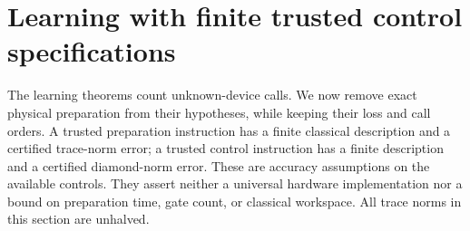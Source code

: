 \section{Learning with finite trusted control specifications}
\label{sec:finitecontrol78}

The learning theorems count unknown-device calls.  We now remove
exact physical preparation from their hypotheses, while keeping
their loss and call orders.  A trusted preparation instruction has a
finite classical description and a certified trace-norm error; a
trusted control instruction has a finite description and a certified
diamond-norm error.  These are accuracy assumptions on the available
controls.  They assert neither a universal hardware implementation
nor a bound on preparation time, gate count, or classical workspace.
All trace norms in this section are unhalved.

